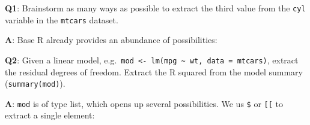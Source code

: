 \documentclass[
]{krantz}
\makeatletter
\newenvironment{Shaded}{\begin{snugshade}}{\end{snugshade}}
\newcommand{\CommentTok}[1]{\textcolor[rgb]{0.56,0.35,0.01}{\textit{#1}}}
\newcommand{\DataTypeTok}[1]{\textcolor[rgb]{0.13,0.29,0.53}{#1}}
\newcommand{\DecValTok}[1]{\textcolor[rgb]{0.00,0.00,0.81}{#1}}
\newcommand{\KeywordTok}[1]{\textcolor[rgb]{0.13,0.29,0.53}{\textbf{#1}}}
\newcommand{\NormalTok}[1]{#1}
\newcommand{\OperatorTok}[1]{\textcolor[rgb]{0.81,0.36,0.00}{\textbf{#1}}}
\newcommand{\StringTok}[1]{\textcolor[rgb]{0.31,0.60,0.02}{#1}}
\newenvironment{kframe}{%
\medskip{}
\setlength{\fboxsep}{.8em}
 \def\at@end@of@kframe{}%
 \ifinner\ifhmode%
  \def\at@end@of@kframe{\end{minipage}}%
  \begin{minipage}{\columnwidth}%
 \fi\fi%
 \def\FrameCommand##1{\hskip\@totalleftmargin \hskip-\fboxsep
 \colorbox{shadecolor}{##1}\hskip-\fboxsep
     \hskip-\linewidth \hskip-\@totalleftmargin \hskip\columnwidth}%
 \MakeFramed {\advance\hsize-\width
   \@totalleftmargin\z@ \linewidth\hsize
   \@setminipage}}%
 {\par\unskip\endMakeFramed%
 \at@end@of@kframe}
\renewenvironment{Shaded}{\begin{kframe}}{\end{kframe}}
\renewcommand{\KeywordTok} [1]{\textcolor[rgb]{0.00,0.44,0.13}{{#1}}}
\renewcommand{\DataTypeTok}[1]{\textcolor[rgb]{0.56,0.13,0.00}{{#1}}}
\renewcommand{\DecValTok}  [1]{\textcolor[rgb]{0.25,0.63,0.44}{{#1}}}
\renewcommand{\StringTok}  [1]{\textcolor[rgb]{0.25,0.44,0.63}{{#1}}}
\renewcommand{\CommentTok} [1]{\textcolor[rgb]{0.38,0.63,0.69}{{#1}}}
\renewcommand{\NormalTok}  [1]{{#1}}
\makeatother
\begin{document}
\textbf{{Q1}}: Brainstorm as many ways as possible to extract the third value from the \texttt{cyl} variable in the \texttt{mtcars} dataset.

\textbf{{A}}: Base R already provides an abundance of possibilities:

\begin{Shaded}
\end{Shaded}

\textbf{{Q2}}: Given a linear model, e.g.~\texttt{mod\ \textless{}-\ lm(mpg\ \textasciitilde{}\ wt,\ data\ =\ mtcars)}, extract the residual degrees of freedom. Extract the R squared from the model summary (\texttt{summary(mod)}).

\textbf{{A}}: \texttt{mod} is of type list, which opens up several possibilities. We us \texttt{\$} or \texttt{{[}{[}} to extract a single element:

\begin{Shaded}
\end{Shaded}
\end{document}
